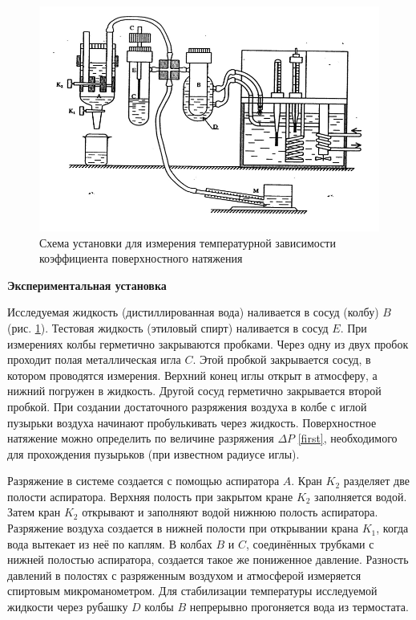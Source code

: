 \documentclass[a4paper, 12pt]{article}
\begin{document}
    \begin{figure}[ht]
        \centering
        \captionsetup{justification=centering, margin=2cm}
        \includegraphics[width=0.8\linewidth]{images/ust.png}
        \caption{Схема установки для измерения температурной зависимости коэффициента поверхностного натяжения}
        \label{pic1}
    \end{figure}
    
    \begin{flushleft}
        {\Large {\bf Экспериментальная установка}}
    \end{flushleft}
    
    Исследуемая жидкость (дистиллированная вода) наливается в сосуд (колбу) $B$ (рис. \ref{pic1}). Тестовая жидкость  (этиловый спирт) наливается  в сосуд $E$.  При измерениях  колбы герметично закрываются  пробками.   Через одну из двух пробок  проходит полая металлическая игла $C$. Этой пробкой закрывается сосуд, в котором  проводятся измерения. Верхний конец иглы открыт в атмосферу, а нижний погружен в жидкость. Другой сосуд герметично закрывается второй пробкой. При создании достаточного  разряжения воздуха в колбе с иглой пузырьки воздуха начинают пробулькивать через жидкость. Поверхностное натяжение можно определить по величине разряжения $\Delta P$ \eqref{first}, необходимого для прохождения пузырьков (при известном радиусе иглы).
    
    Разряжение в системе создается с помощью аспиратора $A$. Кран $K_2$ разделяет две полости аспиратора. Верхняя полость при закрытом кране $K_2$ заполняется водой. Затем кран $K_2$ открывают и заполняют водой нижнюю полость аспиратора. Разряжение воздуха создается в нижней полости при открывании крана $K_1$, когда вода вытекает из неё по каплям. В колбах $B$ и $C$, соединённых трубками с нижней полостью аспиратора, создается такое же пониженное давление. Разность давлений в полостях с разряженным воздухом и атмосферой измеряется спиртовым микроманометром. Для стабилизации температуры исследуемой жидкости через рубашку $D$ колбы $B$ непрерывно прогоняется вода из термостата.
    
\end{document}
